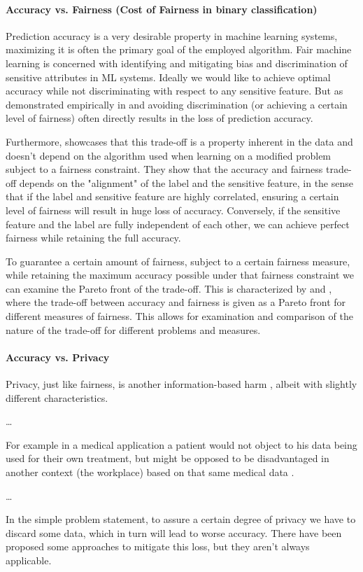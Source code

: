 	\paragraph{Accuracy vs. Fairness (Cost of Fairness in binary classification)}
	Prediction accuracy is a very desirable property in machine learning systems, maximizing it is often the primary goal of the employed algorithm.
	Fair machine learning is concerned with identifying and mitigating bias and discrimination of sensitive attributes in ML systems.
	Ideally we would like to achieve optimal accuracy while not discriminating with respect to any sensitive feature.
	But as demonstrated empirically in \eg \cite{kamiran2010discrimination} and \cite{zliobaite2015relation} avoiding discrimination (or achieving a certain level of fairness) often directly results in the loss of prediction accuracy.

	Furthermore, \cite{menon2018cost} showcases that this trade-off is a property inherent in the data and doesn't depend on the algorithm used when learning on a modified problem subject to a fairness constraint.
	They show that the accuracy and fairness trade-off depends on the "alignment" of the label and the sensitive feature, in the sense that if the label and sensitive feature are highly correlated, ensuring a certain level of fairness will result in huge loss of accuracy.
	Conversely, if the sensitive feature and the label are fully independent of each other, we can achieve perfect fairness while retaining the full accuracy.

	To guarantee a certain amount of fairness, subject to a certain fairness measure, while retaining the maximum accuracy possible under that fairness constraint we can examine the Pareto front of the trade-off. 	
	This is characterized by \cite{liu2020accuracy} and \cite{wei2020fairness}, where the trade-off between accuracy and fairness is given as a Pareto front for different measures of fairness.
	This allows for examination and comparison of the nature of the trade-off for different problems and measures.

	\paragraph{Accuracy vs. Privacy}
	Privacy, just like fairness, is another information-based harm \cite{van2008information}, albeit with slightly different characteristics.

	\dots

	For example in a medical application a patient would not object to his data being used for their own treatment, but might be opposed to be disadvantaged in another context (\eg the workplace) based on that same medical data \cite{van2008information}.

	\dots

	In the simple problem statement, to assure a certain degree of privacy we have to discard some data, which in turn will lead to worse accuracy.
	There have been proposed some approaches to mitigate this loss, but they aren't always applicable.
